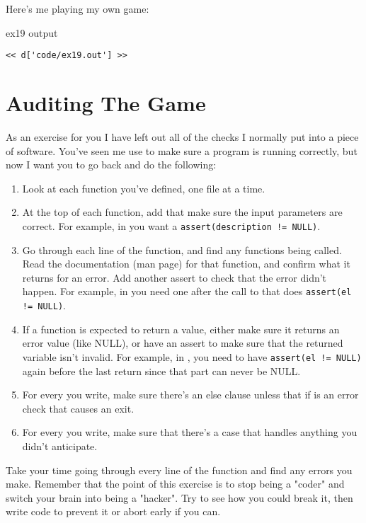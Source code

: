 Here's me playing my own game:

\begin{code}{ex19 output}
\begin{lstlisting}
<< d['code/ex19.out'] >>
\end{lstlisting}
\end{code}


\section{Auditing The Game}

As an exercise for you I have left out all of the  checks
I normally put into a piece of software.  You've seen me use  to
make sure a program is running correctly, but now I want you to go back
and do the following:

\begin{enumerate}
\item Look at each function you've defined, one file at a time.
\item At the top of each function, add  that make sure
    the input parameters are correct.  For example, in 
    you want a \verb|assert(description != NULL)|.
\item Go through each line of the function, and find any functions
    being called.  Read the documentation (man page) for that function,
    and confirm what it returns for an error.  Add another assert to
    check that the error didn't happen.  For example, in 
    you need one after the call to  that does \verb|assert(el != NULL)|.
\item If a function is expected to return a value, either make sure it returns
    an error value (like NULL), or have an assert to make sure that the returned
    variable isn't invalid.  For example, in , you need
    to have \verb|assert(el != NULL)| again before the last return since
    that part can never be NULL.
\item For every  you write, make sure there's an else
    clause unless that if is an error check that causes an exit.
\item For every  you write, make sure that there's
    a  case that handles anything you didn't anticipate.
\end{enumerate}

Take your time going through every line of the function and find any errors you
make.  Remember that the point of this exercise is to stop being a "coder" and
switch your brain into being a "hacker".  Try to see how you could break it,
then write code to prevent it or abort early if you can.

